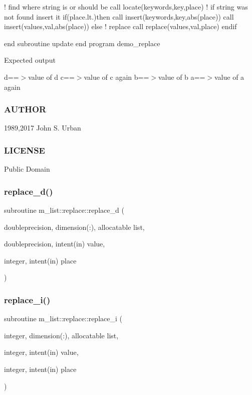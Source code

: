 ! find where string is or should be call locate(keywords,key,place) ! if string was not found insert it if(place.\+lt.)then call insert(keywords,key,abs(place)) call insert(values,val,abs(place)) else ! replace call replace(values,val,place) endif

end subroutine update end program demo\+\_\+replace

Expected output

d==$>$value of d c==$>$value of c again b==$>$value of b a==$>$value of a again

\subsubsection*{A\+U\+T\+H\+OR}

1989,2017 John S. Urban \subsubsection*{L\+I\+C\+E\+N\+SE}

Public Domain \mbox{\label{interfacem__list_1_1replace_a4335c634f2c3a245bed87574c22a9d40}} 
\subsubsection{\texorpdfstring{replace\+\_\+d()}{replace\_d()}}
{\footnotesize\ttfamily subroutine m\+\_\+list\+::replace\+::replace\+\_\+d (\begin{DoxyParamCaption}\item[{doubleprecision, dimension(\+:), allocatable}]{list,  }\item[{doubleprecision, intent(in)}]{value,  }\item[{integer, intent(in)}]{place }\end{DoxyParamCaption})\hspace{0.3cm}{\ttfamily [private]}}

\mbox{\label{interfacem__list_1_1replace_a36315bb68af9cd1845a2d2b9c79a9cb2}} 
\subsubsection{\texorpdfstring{replace\+\_\+i()}{replace\_i()}}
{\footnotesize\ttfamily subroutine m\+\_\+list\+::replace\+::replace\+\_\+i (\begin{DoxyParamCaption}\item[{integer, dimension(\+:), allocatable}]{list,  }\item[{integer, intent(in)}]{value,  }\item[{integer, intent(in)}]{place }\end{DoxyParamCaption})\hspace{0.3cm}{\ttfamily [private]}}

